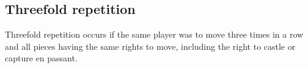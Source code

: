 \documentclass{report}
\begin{document}
\begin{appendices}
\subsection*{Threefold repetition}
\label{def:Threefold_repetition}
Threefold repetition occurs if the same player was to move three times in a row    and all pieces having the same rights to move, including the right to castle or capture en passant.
\end{appendices}
\end{document}

